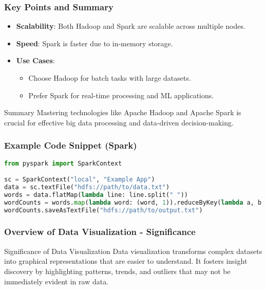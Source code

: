 \documentclass{beamer}
\begin{document}
\begin{frame}[fragile]
    \frametitle{Key Points and Summary}
    \begin{itemize}
        \item \textbf{Scalability}: Both Hadoop and Spark are scalable across multiple nodes.
        \item \textbf{Speed}: Spark is faster due to in-memory storage.
        \item \textbf{Use Cases}:
        \begin{itemize}
            \item Choose Hadoop for batch tasks with large datasets.
            \item Prefer Spark for real-time processing and ML applications.
        \end{itemize}
    \end{itemize}
    \begin{block}{Summary}
        Mastering technologies like Apache Hadoop and Apache Spark is crucial for effective big data processing and data-driven decision-making.
    \end{block}
\end{frame}

\begin{frame}[fragile]
    \frametitle{Example Code Snippet (Spark)}
    \begin{lstlisting}[language=Python]
from pyspark import SparkContext

sc = SparkContext("local", "Example App")
data = sc.textFile("hdfs://path/to/data.txt")
words = data.flatMap(lambda line: line.split(" "))
wordCounts = words.map(lambda word: (word, 1)).reduceByKey(lambda a, b: a + b)
wordCounts.saveAsTextFile("hdfs://path/to/output.txt")
    \end{lstlisting}
\end{frame}

\begin{frame}[fragile]
    \frametitle{Overview of Data Visualization - Significance}
    \begin{block}{Significance of Data Visualization}
        Data visualization transforms complex datasets into graphical representations that are easier to understand. It fosters insight discovery by highlighting patterns, trends, and outliers that may not be immediately evident in raw data.
    \end{block}
\end{frame}
\end{document}
